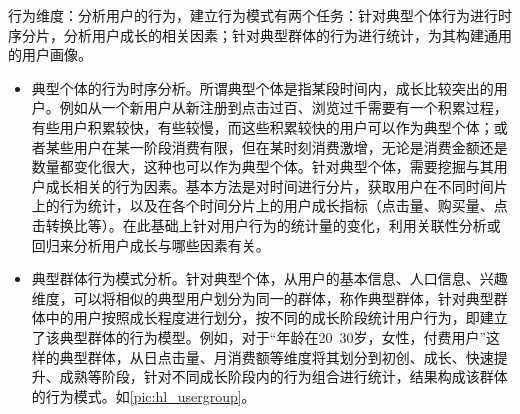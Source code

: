         行为维度：分析用户的行为，建立行为模式有两个任务：针对典型个体行为进行时序分片，分析用户成长的相关因素；针对典型群体的行为进行统计，为其构建通用的用户画像。
        \begin{itemize}
        \item 典型个体的行为时序分析。所谓典型个体是指某段时间内，成长比较突出的用户。例如从一个新用户从新注册到点击过百、浏览过千需要有一个积累过程，有些用户积累较快，有些较慢，而这些积累较快的用户可以作为典型个体；或者某些用户在某一阶段消费有限，但在某时刻消费激增，无论是消费金额还是数量都变化很大，这种也可以作为典型个体。针对典型个体，需要挖掘与其用户成长相关的行为因素。基本方法是对时间进行分片，获取用户在不同时间片上的行为统计，以及在各个时间分片上的用户成长指标（点击量、购买量、点击转换比等）。在此基础上针对用户行为的统计量的变化，利用关联性分析或回归来分析用户成长与哪些因素有关。
        \item 典型群体行为模式分析。针对典型个体，从用户的基本信息、人口信息、兴趣维度，可以将相似的典型用户划分为同一的群体，称作典型群体，针对典型群体中的用户按照成长程度进行划分，按不同的成长阶段统计用户行为，即建立了该典型群体的行为模型。例如，对于“年龄在20~30岁，女性，付费用户”这样的典型群体，从日点击量、月消费额等维度将其划分到初创、成长、快速提升、成熟等阶段，针对不同成长阶段内的行为组合进行统计，结果构成该群体的行为模式。如\autoref{pic:hl_usergroup}。
        \end{itemize}

        \begin{figure}
        \centering
          \label{pic:hl_usergroup}
        \end{figure}

